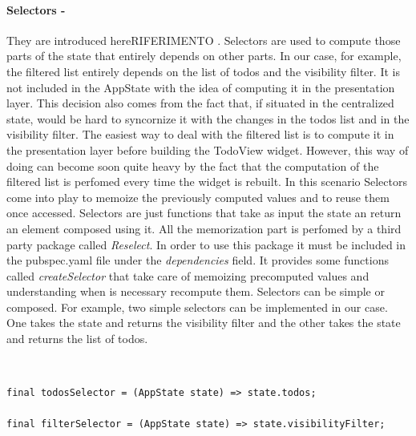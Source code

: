 \paragraph{Selectors - }
\label{subpar:todo_app_bloc_core_state}
They are introduced hereRIFERIMENTO . Selectors are used to compute those parts of the state that entirely depends on other parts. In our case, for example, the filtered list entirely depends on the list of todos and the visibility filter. It is not included in the AppState with the idea of computing it in the presentation layer. This decision also comes from the fact that, if situated in the centralized state, would be hard to syncornize it with the changes in the todos list and in the visibility filter. The easiest way to deal with the filtered list is to compute it in the presentation layer before building the TodoView widget. However, this way of doing can become soon quite heavy by the fact that the computation of the filtered list is perfomed every time the widget is rebuilt. In this scenario Selectors come into play to memoize the previously computed values and to reuse them once accessed. Selectors are just functions that take as input the state an return an element composed using it. All the memorization part is perfomed by a third party package called \textit{Reselect}. In order to use this package it must be included in the pubspec.yaml file under the \textit{dependencies} field. It provides some functions called \textit{createSelector} that take care of memoizing precomputed values and understanding when is necessary recompute them. Selectors can be simple or composed. For example, two simple selectors can be implemented in our case. One takes the state and returns the visibility filter and the other takes the state and returns the list of todos.
\begin{code}
\mbox{}\\
 \mbox{}
		\label{code:2.63}
\begin{verbatim}
final todosSelector = (AppState state) => state.todos;

final filterSelector = (AppState state) => state.visibilityFilter;
\end{verbatim}
\mbox{}
\end{code}

